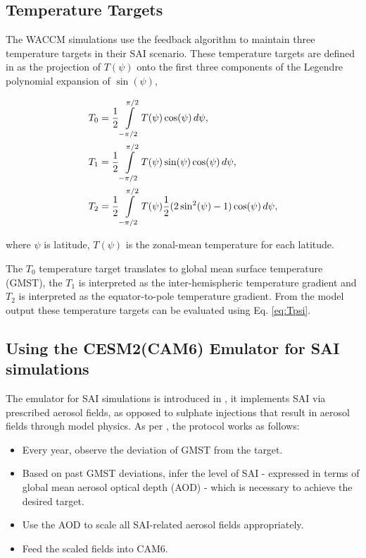 \subsection{Temperature Targets}\label{temptargets}
The WACCM simulations use the feedback algorithm to maintain three temperature targets in their SAI scenario. These temperature targets are defined in \textcite{kravitz2016} as the projection of $T(\psi)$ onto the first three components of the Legendre polynomial expansion of $\sin(\psi)$,

\begin{equation}\label{eq:Tpsi}
    \begin{split}
        T_0 &= \frac{1}{2} \int\displaylimits_{-\pi/2}^{\pi/2} T(\psi) \cos(\psi) \mathop{d\psi},\\
        T_1 &= \frac{1}{2} \int\displaylimits_{-\pi/2}^{\pi/2} T(\psi) \sin(\psi) \cos(\psi) \mathop{d\psi},\\
        T_2 &= \frac{1}{2} \int\displaylimits_{-\pi/2}^{\pi/2} T(\psi) \frac{1}{2}(2\sin^2(\psi) -1) \cos(\psi) \mathop{d\psi},
    \end{split}
\end{equation}

\noindent where $\psi$ is latitude, $T(\psi)$ is the zonal-mean temperature for each latitude.

The $T_0$ temperature target translates to global mean surface temperature (GMST), the $T_1$ is interpreted as the inter-hemispheric temperature gradient and $T_2$ is interpreted as the equator-to-pole temperature gradient. From the model output these temperature targets can be evaluated using Eq. \ref{eq:Tpsi}. 

\subsection{Using the CESM2(CAM6) Emulator for SAI simulations}\label{emulator_pt1}
The emulator for SAI simulations is introduced in \textcite{pfluger2024}, it implements SAI via prescribed aerosol fields, as opposed to sulphate injections that result in aerosol fields through model physics. As per \textcite{pfluger2024}, the protocol works as follows:

\begin{itemize}
    \item Every year, observe the deviation of GMST from the target.
    \item Based on past GMST deviations, infer the level of SAI - expressed in terms of global mean aerosol optical depth (AOD) - which is necessary to achieve the desired target.
    \item Use the AOD to scale all SAI-related aerosol fields appropriately.
    \item Feed the scaled fields into CAM6.
\end{itemize}


